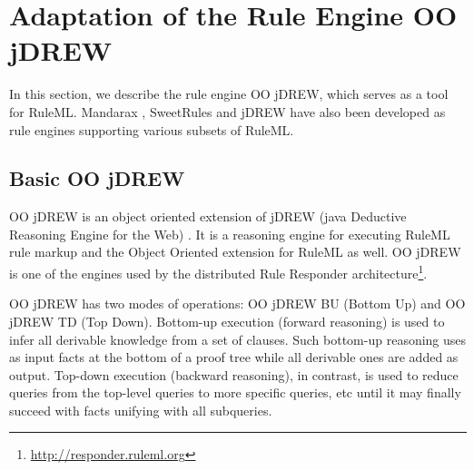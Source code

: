 \section{Adaptation of the Rule Engine OO jDREW}

\hspace{0.3in}In this section, we describe the rule engine OO jDREW, which serves as a tool for RuleML. Mandarax \cite{md:05}, SweetRules \cite{sr:05} and jDREW \cite{JD:05} have also been developed as rule engines supporting various subsets of RuleML.

\subsection{Basic OO jDREW}

\hspace{0.3in}OO jDREW is an object oriented extension of jDREW (java Deductive Reasoning Engine for the Web) \cite{JD:05}. It is a reasoning engine for executing RuleML rule markup and the Object Oriented extension for RuleML as well. OO jDREW is one of the engines used by the distributed Rule Responder architecture\footnote{\href{http://responder.ruleml.org}{\url{http://responder.ruleml.org}}}.

\hspace{0.3in}OO jDREW has two modes of operations: OO jDREW
BU (Bottom Up) and OO jDREW TD (Top Down). Bottom-up execution (forward reasoning) is used to infer all derivable knowledge from a set of clauses. Such bottom-up reasoning uses as input facts at the bottom of a proof tree while all derivable ones are added as output. 
\hspace{0.3in}Top-down execution (backward reasoning), in contrast, is used to reduce queries from the top-level queries to more specific queries, etc until it may finally succeed with facts unifying with all subqueries.


